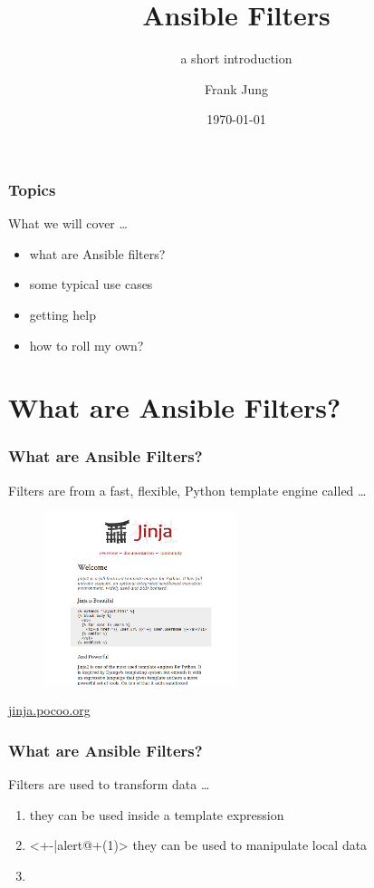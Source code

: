 \documentclass[pdf]{beamer}
\title{Ansible Filters}
\subtitle{a short introduction}
\author{Frank Jung}
\institute{frankhjung@linux.com}
\date{ \today }
\begin{document}
\begin{frame}
  \titlepage{}
\end{frame}


\begin{frame}
  \frametitle{Topics}
  What we will cover \ldots
  \pause{}
  \begin{itemize}
    \item<+-> what are Ansible filters?
    \item<+-> some typical use cases
    \item<+-> getting help
    \item<+-> how to roll my own?
  \end{itemize}
\end{frame}

\section{What are Ansible Filters?}

\begin{frame}
  \frametitle{What are Ansible Filters?}
  Filters are from a fast, flexible, Python template engine called \ldots
  \pause{}
  \begin{center}
    \begin{figure}
      \includegraphics[width=0.5\textwidth]{jinja.png}
    \end{figure}
    \href{http://jinja.pocoo.org}{jinja.pocoo.org}
  \end{center}
\end{frame}

\begin{frame}
  \frametitle{What are Ansible Filters?}
  Filters are used to transform data \ldots
  \pause{}
  \begin{enumerate}
    \item<+-> {they can be used inside a template expression}
    \item<+-|alert@+(1)> {they can be used to manipulate local data}
    \item[]
  \end{enumerate}
\end{frame}
\end{document}
